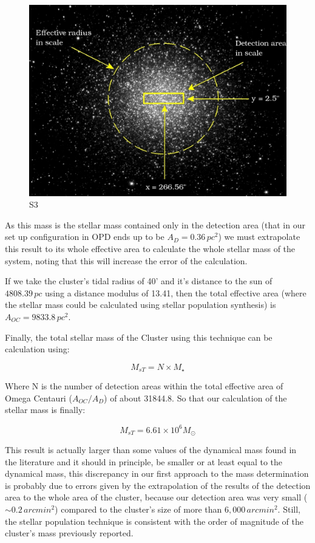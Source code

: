 \begin{figure}[H]
\centering
\includegraphics[width=12cm]{images/OmegaCentauriii.jpg}
\caption[Si]{S3}
\end{figure}

As this mass is the stellar mass contained only in the detection area (that in our set up configuration in OPD ends up to be $A_{D}=0.36\,pc^{2}$) we must extrapolate this result to its whole effective area to calculate the whole stellar mass of the system, noting that this will increase the error of the calculation.

If we take the cluster's tidal radius of 40' and it's distance to the sun of $4808.39\,pc$ using a distance modulus of 13.41, then the total effective area (where the stellar mass could be calculated using stellar population synthesis) is $A_{OC}=9833.8\,pc^{2}$. 

Finally, the total stellar mass of the Cluster using this technique can be calculation using:

\begin{equation}
M_{s T} = N \times M_{\star}
\end{equation}

Where N is the number of detection areas within the total effective area of Omega Centauri ($A_{OC}/A_{D}$) of about 31844.8. So that our calculation of the stellar mass is finally:

\begin{equation}
M_{s T} = 6.61 \times 10^{6}M_{\odot}
\end{equation}
 
This result is actually larger than some values  of the dynamical mass found in the literature and it should in principle, be smaller or at least equal to the dynamical mass, this discrepancy in our first approach to the mass determination is probably due to errors given by the extrapolation of the results of the detection area to the whole area of the cluster, because our detection area was very small ($\sim 0.2 \, arcmin^{2}$) compared to the cluster's size of more than $6,000 \, arcmin^{2}$. Still, the stellar population technique is consistent with the order of magnitude of the cluster's mass previously reported. 

